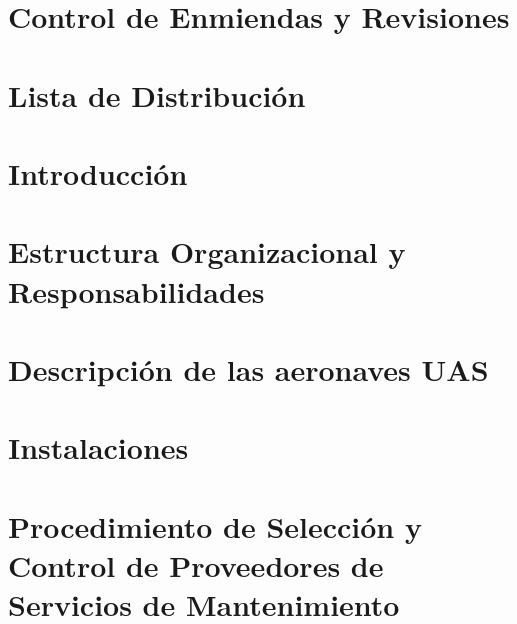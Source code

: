 \documentclass[12pt,openany]{report}
\begin{document}
\chapter*{Control de Enmiendas y Revisiones}


\chapter*{Lista de Distribución}

\label{fin_prelim}

\clearpage

\justifying
{}
\setlength{\emergencystretch}{3em}
\setlength{\parindent}{0pt}


\chapter{Introducción}
\label{inicio_cap1}

\label{fin_cap1}

\chapter{Estructura Organizacional y Responsabilidades}
\label{inicio_cap2}

\label{fin_cap2}

\chapter{Descripción de las aeronaves UAS}
\label{inicio_cap3}

\label{fin_cap3}

\chapter{Instalaciones}
\label{inicio_cap4}

\label{fin_cap4}

\chapter{Procedimiento de Selección y Control de Proveedores de Servicios de Mantenimiento}
\label{inicio_cap5}

\label{fin_cap5}
\end{document}
